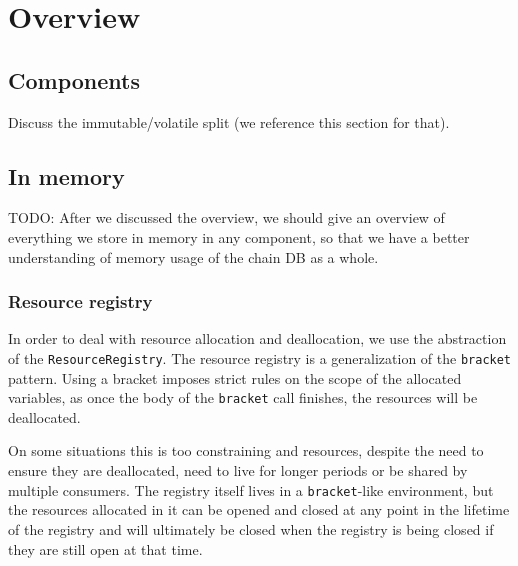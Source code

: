 \chapter{Overview}
\label{storage}

\section{Components}
\label{storage:components}


Discuss the immutable/volatile split (we reference this section for that).

\section{In memory}
\label{storage:inmemory}

TODO: After we discussed the overview, we should give an overview of everything
we store in memory in any component, so that we have a better understanding of
memory usage of the chain DB as a whole.

\subsection{Resource registry}
\label{storage:resourceregistry}

In order to deal with resource allocation and deallocation, we use the
abstraction of the \lstinline!ResourceRegistry!. The resource registry is a
generalization of the \lstinline!bracket! pattern. Using a bracket imposes strict
rules on the scope of the allocated variables, as once the body of the
\lstinline!bracket! call finishes, the resources will be deallocated.

On some situations this is too constraining and resources, despite the need to
ensure they are deallocated, need to live for longer periods or be shared by
multiple consumers. The registry itself lives in a \lstinline!bracket!-like
environment, but the resources allocated in it can be opened and closed at any
point in the lifetime of the registry and will ultimately be closed when the
registry is being closed if they are still open at that time.

